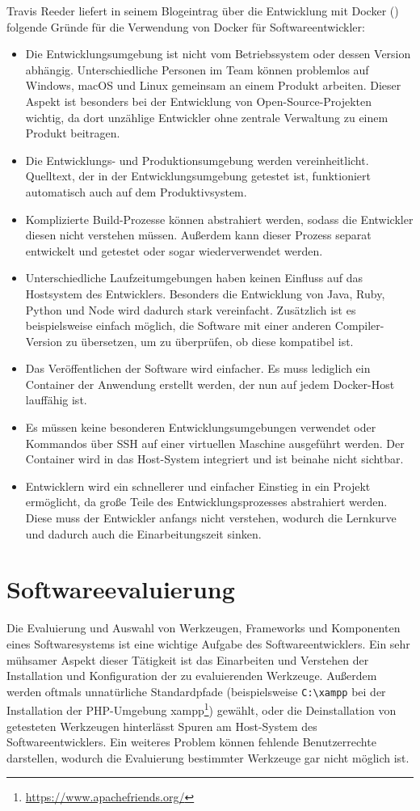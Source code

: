 Travis Reeder liefert in seinem Blogeintrag über die Entwicklung mit Docker (\autocite{why-docker-for-development:online}) folgende Gründe für die Verwendung von Docker für Softwareentwickler:
\begin{itemize}
    \item Die Entwicklungsumgebung ist nicht vom Betriebssystem oder dessen Version abhängig. Unterschiedliche Personen im Team können problemlos auf Windows, macOS und Linux gemeinsam an einem Produkt arbeiten. Dieser Aspekt ist besonders bei der Entwicklung von Open-Source-Projekten wichtig, da dort unzählige Entwickler ohne zentrale Verwaltung zu einem Produkt beitragen.
    \item Die Entwicklungs- und Produktionsumgebung werden vereinheitlicht. Quelltext, der in der Entwicklungsumgebung getestet ist, funktioniert automatisch auch auf dem Produktivsystem.
    \item Komplizierte Build-Prozesse können abstrahiert werden, sodass die Entwickler diesen nicht verstehen müssen. Außerdem kann dieser Prozess separat entwickelt und getestet oder sogar wiederverwendet werden.
    \item Unterschiedliche Laufzeitumgebungen haben keinen Einfluss auf das Hostsystem des Entwicklers. Besonders die Entwicklung von Java, Ruby, Python und Node wird dadurch stark vereinfacht. Zusätzlich ist es beispielsweise einfach möglich, die Software mit einer anderen Compiler-Version zu übersetzen, um zu überprüfen, ob diese kompatibel ist.
    \item Das Veröffentlichen der Software wird einfacher. Es muss lediglich ein Container der Anwendung erstellt werden, der nun auf jedem Docker-Host lauffähig ist.
    \item Es müssen keine besonderen Entwicklungsumgebungen verwendet oder Kommandos über SSH auf einer virtuellen Maschine ausgeführt werden. Der Container wird in das Host-System integriert und ist beinahe nicht sichtbar.
    \item Entwicklern wird ein schnellerer und einfacher Einstieg in ein Projekt ermöglicht, da große Teile des Entwicklungsprozesses abstrahiert werden. Diese muss der Entwickler anfangs nicht verstehen, wodurch die Lernkurve und dadurch auch die Einarbeitungszeit sinken.
\end{itemize}


\section{Softwareevaluierung}
\label{sec:softwareevaluierung}
Die Evaluierung und Auswahl von Werkzeugen, Frameworks und Komponenten eines Softwaresystems ist eine wichtige Aufgabe des Softwareentwicklers.
Ein sehr mühsamer Aspekt dieser Tätigkeit ist das Einarbeiten und Verstehen der Installation und Konfiguration der zu evaluierenden Werkzeuge.
Außerdem werden oftmals unnatürliche Standardpfade (beispielsweise \verb$C:\xampp$ bei der Installation der PHP-Umgebung xampp\footnote{\url{https://www.apachefriends.org/}}) gewählt, oder die Deinstallation von getesteten Werkzeugen hinterlässt Spuren am Host-System des Softwareentwicklers.
Ein weiteres Problem können fehlende Benutzerrechte darstellen, wodurch die Evaluierung bestimmter Werkzeuge gar nicht möglich ist.

